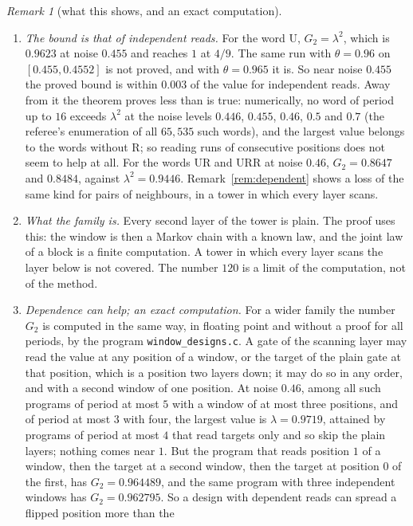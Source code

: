 \documentclass[11pt]{amsart}
\theoremstyle{definition}
\theoremstyle{remark}
\newtheorem{remark}[theorem]{Remark}
\begin{document}
\begin{remark}[what this shows, and an exact computation]\label{rem:scan}
\begin{enumerate}[label=(\roman*),leftmargin=2.4em]
\item \emph{The bound is that of independent reads.} For the word $\mathrm U$,
$G_2=\lambda^2$, which is $0.9623$ at noise $0.455$ and reaches $1$ at $4/9$. The same run with
$\theta=0.96$ on $[0.455,0.4552]$ is not proved, and with $\theta=0.965$ it is. So near noise
$0.455$ the proved bound is within $0.003$ of the value for independent reads. Away from it the
theorem proves less than is true: numerically, no word of period up to $16$ exceeds $\lambda^2$
at the noise levels $0.446$, $0.455$, $0.46$, $0.5$ and $0.7$ (the referee's enumeration of all
$65{,}535$ such words), and the largest value belongs to the words without $\mathrm R$; so
reading runs of consecutive positions does not seem to help at all. For the words $\mathrm{UR}$ and $\mathrm{URR}$ at noise
$0.46$, $G_2=0.8647$ and $0.8484$, against $\lambda^2=0.9446$. Remark~\ref{rem:dependent} shows a loss of the same kind for pairs
of neighbours, in a tower in which every layer scans.
\item \emph{What the family is.} Every second layer of the tower is plain. The proof uses this:
the window is then a Markov chain with a known law, and the joint law of a block is a finite
computation. A tower in which every layer scans the layer below is not covered. The number
$120$ is a limit of the computation, not of the method.
\item \emph{Dependence can help; an exact computation.} For a wider family the number $G_2$
is computed in the same way, in floating point and without a proof for all periods, by the
program \texttt{window\_designs.c}. A gate of the scanning layer may read the value at any position of a window,
or the target of the plain gate at that position, which is a position two layers down; it may
do so in any order, and with a second window of one position. At noise $0.46$, among all such
programs of period at most $5$ with a window of at most three positions, and of period at most
$3$ with four, the largest value is $\lambda=0.9719$, attained by programs of period at most
$4$ that read targets only and so skip the plain layers; nothing comes near $1$. But the program that reads position
$1$ of a window, then the target at a second window, then the target at position $0$ of the
first, has $G_2=0.964489$, and the same program with three independent windows has
$G_2=0.962795$. So a design with dependent reads can spread a flipped position more than the

\end{enumerate}
\end{remark}
\end{document}
